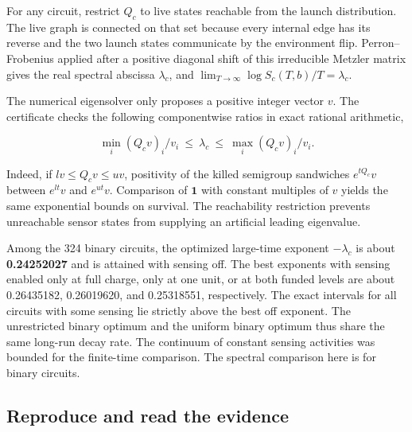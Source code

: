 \documentclass[
  11pt,
]{article}
\newenvironment{Shaded}{}{}
\newcommand{\FunctionTok}[1]{\textcolor[rgb]{0.02,0.16,0.49}{#1}}
\newcommand{\NormalTok}[1]{#1}
\newcommand{\OperatorTok}[1]{\textcolor[rgb]{0.40,0.40,0.40}{#1}}
\newcommand{\StringTok}[1]{\textcolor[rgb]{0.25,0.44,0.63}{#1}}
\newcommand{\VariableTok}[1]{\textcolor[rgb]{0.10,0.09,0.49}{#1}}
\begin{document}
For any circuit, restrict \(Q_c\) to live states reachable from the
launch distribution. The live graph is connected on that set because
every internal edge has its reverse and the two launch states
communicate by the environment flip. Perron--Frobenius applied after a
positive diagonal shift of this irreducible Metzler matrix gives the
real spectral abscissa \(\lambda_c\), and
\(\lim_{T\to\infty}\log S_c(T,b)/T=\lambda_c\).

The numerical eigensolver only proposes a positive integer vector \(v\).
The certificate checks the following componentwise ratios in exact
rational arithmetic,

\[
 \min_i (Q_cv)_i/v_i\ \le\ \lambda_c\ \le\
 \max_i (Q_cv)_i/v_i .
\]

Indeed, if \(l v\le Q_cv\le u v\), positivity of the killed semigroup
sandwiches \(e^{tQ_c}v\) between \(e^{lt}v\) and \(e^{ut}v\). Comparison
of \(\mathbf1\) with constant multiples of \(v\) yields the same
exponential bounds on survival. The reachability restriction prevents
unreachable sensor states from supplying an artificial leading
eigenvalue.

Among the 324 binary circuits, the optimized large-time exponent
\(-\lambda_c\) is about \textbf{0.24252027} and is attained with sensing
off. The best exponents with sensing enabled only at full charge, only
at one unit, or at both funded levels are about 0.26435182, 0.26019620,
and 0.25318551, respectively. The exact intervals for all circuits with
some sensing lie strictly above the best off exponent. The unrestricted
binary optimum and the uniform binary optimum thus share the same
long-run decay rate. The continuum of constant sensing activities was
bounded for the finite-time comparison. The spectral comparison here is
for binary circuits.

\subsection{Reproduce and read the
evidence}\label{reproduce-and-read-the-evidence}

\begin{Shaded}
\end{Shaded}
\end{document}
